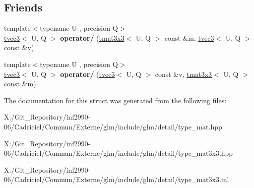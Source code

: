 \subsection*{Friends}
\begin{DoxyCompactItemize}
\item 
\hypertarget{structglm_1_1detail_1_1tmat3x3_ac84f82f1605a6094a397c84daa80a201}{{\footnotesize template$<$typename U , precision Q$>$ }\\\hyperlink{structglm_1_1detail_1_1tvec3}{tvec3}$<$ U, Q $>$ {\bfseries operator/} (\hyperlink{structglm_1_1detail_1_1tmat3x3}{tmat3x3}$<$ U, Q $>$ const \&m, \hyperlink{structglm_1_1detail_1_1tvec3}{tvec3}$<$ U, Q $>$ const \&v)}\label{structglm_1_1detail_1_1tmat3x3_ac84f82f1605a6094a397c84daa80a201}

\item 
\hypertarget{structglm_1_1detail_1_1tmat3x3_a62cedcc444ac62727b8ae82f6b3249b8}{{\footnotesize template$<$typename U , precision Q$>$ }\\\hyperlink{structglm_1_1detail_1_1tvec3}{tvec3}$<$ U, Q $>$ {\bfseries operator/} (\hyperlink{structglm_1_1detail_1_1tvec3}{tvec3}$<$ U, Q $>$ const \&v, \hyperlink{structglm_1_1detail_1_1tmat3x3}{tmat3x3}$<$ U, Q $>$ const \&m)}\label{structglm_1_1detail_1_1tmat3x3_a62cedcc444ac62727b8ae82f6b3249b8}

\end{DoxyCompactItemize}


The documentation for this struct was generated from the following files\-:\begin{DoxyCompactItemize}
\item 
X\-:/\-Git\-\_\-\-Repository/inf2990-\/06/\-Cadriciel/\-Commun/\-Externe/glm/include/glm/detail/type\-\_\-mat.\-hpp\item 
X\-:/\-Git\-\_\-\-Repository/inf2990-\/06/\-Cadriciel/\-Commun/\-Externe/glm/include/glm/detail/type\-\_\-mat3x3.\-hpp\item 
X\-:/\-Git\-\_\-\-Repository/inf2990-\/06/\-Cadriciel/\-Commun/\-Externe/glm/include/glm/detail/type\-\_\-mat3x3.\-inl\end{DoxyCompactItemize}
